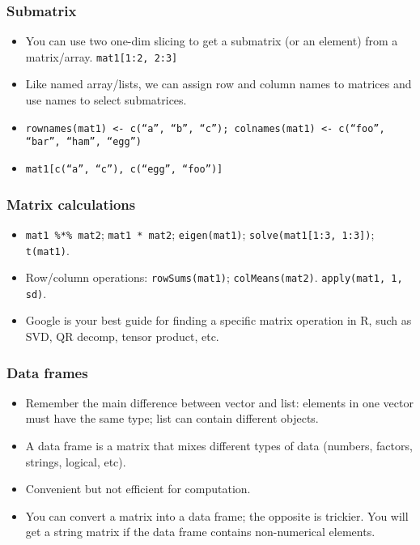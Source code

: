 \begin{frame}
  \frametitle{Submatrix}
  \begin{itemize}
  \item You can use two one-dim slicing to get a submatrix (or an
    element) from a matrix/array. \texttt{mat1[1:2, 2:3]}
  \item Like named array/lists, we can assign row and column names to
    matrices and use names to select submatrices.
  \item \texttt{rownames(mat1) <- c(``a'', ``b'', ``c''); colnames(mat1) <- c(``foo'', ``bar'', ``ham'', ``egg'')}
  \item \texttt{mat1[c(``a'', ``c''), c(``egg'', ``foo'')]}
  \end{itemize}
\end{frame}

\begin{frame}
  \frametitle{Matrix calculations}
  \begin{itemize}
  \item \texttt{mat1 \%*\% mat2}; \texttt{mat1 * mat2};
    \texttt{eigen(mat1)}; \texttt{solve(mat1[1:3, 1:3])};
    \texttt{t(mat1)}.
  \item Row/column operations: \texttt{rowSums(mat1)};
    \texttt{colMeans(mat2)}. \texttt{apply(mat1, 1, sd)}.
  \item Google is your best guide for finding a specific matrix
    operation in R, such as SVD, QR decomp, tensor product, etc.
  \end{itemize}
\end{frame}

\begin{frame}
  \frametitle{Data frames}
  \begin{itemize}
  \item Remember the main difference between vector and list: elements
    in one vector must have the same type; list can contain different
    objects.
  \item A data frame is a matrix that mixes different types of data
    (numbers, factors, strings, logical, etc).
  \item Convenient but not efficient for computation.
  \item You can convert a matrix into a data frame; the opposite is
    trickier. You will get a string matrix if the data frame contains
    non-numerical elements.
  \end{itemize}
\end{frame}

